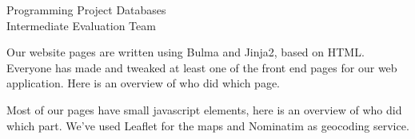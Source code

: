 \documentclass{article}
\newcounter{team}
\begin{document}

	\begin{Minutes}{Programming Project Databases \\ Intermediate Evaluation Team }

		\maketitle

		    Our website pages are written using Bulma and Jinja2, based on HTML. Everyone has made and tweaked at least one of the front end pages for our web application. Here is an overview of who did which page.


    	 Most of our pages have small javascript elements, here is an overview of who did which part. We've used Leaflet for the maps and Nominatim as geocoding service.


\end{Minutes}
\end{document}
